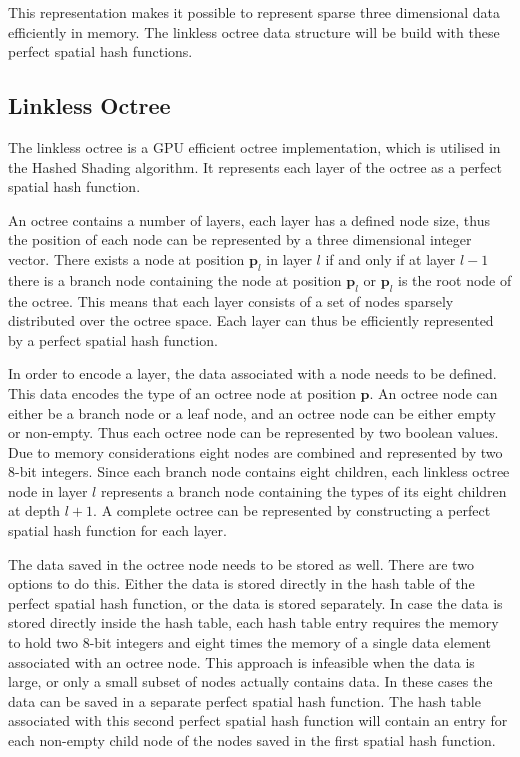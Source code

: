 This representation makes it possible to represent sparse three dimensional data efficiently
in memory. The linkless octree data structure will be build with these perfect spatial hash
functions.

\subsection{Linkless Octree}

The linkless octree is a GPU efficient octree implementation, which is utilised in the
Hashed Shading algorithm. It represents each layer of the octree as a perfect spatial
hash function.

An octree contains a number of layers, each layer has a defined node size, thus the position
of each node can be represented by a three dimensional integer vector. There exists a node
at position $\mathbf{p}_l$ in layer $\mathit{l}$ if and only if at layer $\mathit{l} - 1$
there is a branch node containing the node at position $\mathbf{p}_l$ or $\mathbf{p}_l$ is the
root node of the octree. This means that each layer consists of a set of nodes sparsely distributed
over the octree space. Each layer can thus be efficiently represented by a perfect spatial hash function.

In order to encode a layer, the data associated with a node needs to be defined. This data encodes
the type of an octree node at position $\mathbf{p}$. An octree node can either be a branch
node or a leaf node, and an octree node can be either empty or non-empty. Thus each octree node
can be represented by two boolean values. Due to memory considerations eight nodes are combined
and represented by two 8-bit integers. Since each branch node contains eight children, each
linkless octree node in layer $\mathit{l}$ represents a branch node containing the types of
its eight children at depth $\mathit{l}+1$.
A complete octree can be represented by constructing a perfect spatial hash function for each
layer.

The data saved in the octree node needs to be stored as well. There are two options to do this.
Either the data is stored directly in the hash table of the perfect spatial hash function, or
the data is stored separately. In case the data is stored directly inside the hash table,
each hash table entry requires the memory to hold two 8-bit integers and eight times the
memory of a single data element associated with an octree node. This approach is infeasible
when the data is large, or only a small subset of nodes actually contains data. In these
cases the data can be saved in a separate perfect spatial hash function. The hash table
associated with this second perfect spatial hash function will contain an entry for each non-empty
child node of the nodes saved in the first spatial hash function.

